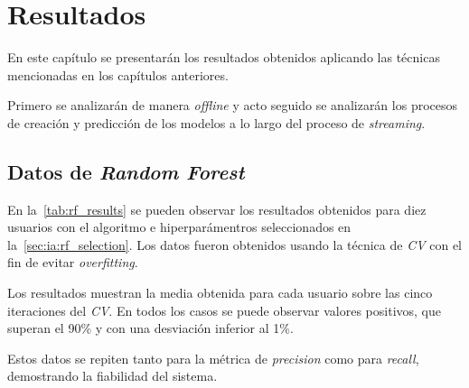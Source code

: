 \chapter{Resultados}
\label{sec:results}

En este capítulo se presentarán los resultados obtenidos aplicando las técnicas mencionadas en los capítulos anteriores.

Primero se analizarán de manera \textit{offline} y acto seguido se analizarán los procesos de creación y predicción de los modelos a lo largo del proceso de \textit{streaming}.


\section{Datos de \textit{Random Forest}}

En la~\cref{tab:rf_results} se pueden observar los resultados obtenidos para diez usuarios con el algoritmo e hiperparámentros seleccionados en la~\cref{sec:ia:rf_selection}. Los datos fueron obtenidos usando la técnica de \textit{CV} con el fin de evitar \textit{overfitting}.

Los resultados muestran la media obtenida para cada usuario sobre las cinco iteraciones del \textit{CV}. En todos los casos se puede observar valores positivos, que superan el 90\% y con una desviación inferior al 1\%.

Estos datos se repiten tanto para la métrica de \textit{precision} como para \textit{recall}, demostrando la fiabilidad del sistema.

